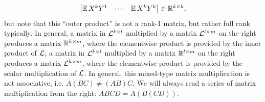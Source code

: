 \documentclass[main.tex]{subfiles}
\begin{document}
\begin{defn}
\begin{align*}
\begin{bmatrix}
    \operatorname*{\mathbb{E}} X^k Y^1 & \cdots & \operatorname*{\mathbb{E}} X^k Y^k
  \end{bmatrix} \in \mathbb{R}^{k\times k},
\end{align*}
but note that this ``outer product'' is not a rank-1 matrix, but rather full rank typically.
In general, a matrix in $\mathcal{L}^{k \times l}$ multiplied by a matrix $\mathcal{L}^{l \times m}$ on the right produces a matrix $\mathbb{R}^{k \times m}$, where the elementwise product is provided by the inner product of $\mathcal{L}$;
a matrix in $\mathcal{L}^{k \times l}$ multiplied by a matrix $\mathbb{R}^{l \times m}$ on the right produces a matrix $\mathcal{L}^{k \times m}$, where the elementwise product is provided by the scalar multiplication of $\mathcal{L}$.
In general, this mixed-type matrix multiplication is not associative, i.e. $A(BC) \ne (AB)C$.
We will always read a series of matrix multiplication from the right: $ABCD = A(B(CD))$.

\end{defn}

\newcommand{\phz}{\phantom{0}}
\newcommand{\sqmat}[1]{
    \begin{bmatrix}
    \phz
      &\phz
        &\phz\\
    \phz
      &#1
        &\phz\\
    \phz
      &\phz
        &\phz
    \end{bmatrix}}
\newcommand{\colmat}[1]{
    \begin{bmatrix}
    \phz\\
    #1\\
    \phz
    \end{bmatrix}}
\end{document}
